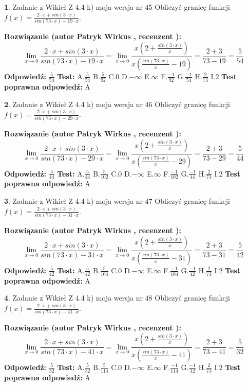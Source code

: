 \documentclass[12pt, a4paper]{article}
\theoremstyle{definition} %
\newtheorem{zad}{}
\newcommand{\zadStart}[1]{\begin{zad}#1\newline}
\newcommand{\zadStop}{\end{zad}}
\newcommand{\rozwStart}[2]{\noindent \textbf{Rozwiązanie (autor #1 , recenzent #2): }\newline}
\newcommand{\rozwStop}{\newline}
\newcommand{\odpStart}{\noindent \textbf{Odpowiedź:}\newline}
\newcommand{\odpStop}{\newline}
\newcommand{\testStart}{\noindent \textbf{Test:}\newline}
\newcommand{\testStop}{\newline}
\newcommand{\kluczStart}{\noindent \textbf{Test poprawna odpowiedź:}\newline}
\newcommand{\kluczStop}{\newline}
\begin{document}
\zadStart{Zadanie z Wikieł Z 4.4 k) moja wersja nr 45}
Obliczyć granicę funkcji $f(x)=\frac{2\cdot x +sin(3\cdot x)}{sin(73\cdot x) -19\cdot x}$.
\zadStop
\rozwStart{Patryk Wirkus}{}
$$\lim\limits_{x\to 0}\frac{2\cdot x +sin(3\cdot x)}{sin(73\cdot x) -19\cdot x}
=\lim\limits_{x\to 0}\frac{x(2+\frac{sin(3\cdot x)}{x})}{x(\frac{sin(73\cdot x)}{x}-19)}
=\frac{2+3}{73-19} = \frac{5}{54}$$
\rozwStop
\odpStart
$\frac{5}{54}$
\odpStop
\testStart
A.$\frac{5}{54}$
B.$\frac{5}{92}$
C.$0$
D.$-\infty$
E.$\infty$
F.$\frac{-1}{92}$
G.$\frac{-1}{54}$
H.$\frac{2}{73}$
I.$2$
\testStop
\kluczStart
A
\kluczStop



\zadStart{Zadanie z Wikieł Z 4.4 k) moja wersja nr 46}
Obliczyć granicę funkcji $f(x)=\frac{2\cdot x +sin(3\cdot x)}{sin(73\cdot x) -29\cdot x}$.
\zadStop
\rozwStart{Patryk Wirkus}{}
$$\lim\limits_{x\to 0}\frac{2\cdot x +sin(3\cdot x)}{sin(73\cdot x) -29\cdot x}
=\lim\limits_{x\to 0}\frac{x(2+\frac{sin(3\cdot x)}{x})}{x(\frac{sin(73\cdot x)}{x}-29)}
=\frac{2+3}{73-29} = \frac{5}{44}$$
\rozwStop
\odpStart
$\frac{5}{44}$
\odpStop
\testStart
A.$\frac{5}{44}$
B.$\frac{5}{102}$
C.$0$
D.$-\infty$
E.$\infty$
F.$\frac{-1}{102}$
G.$\frac{-1}{44}$
H.$\frac{2}{73}$
I.$2$
\testStop
\kluczStart
A
\kluczStop



\zadStart{Zadanie z Wikieł Z 4.4 k) moja wersja nr 47}
Obliczyć granicę funkcji $f(x)=\frac{2\cdot x +sin(3\cdot x)}{sin(73\cdot x) -31\cdot x}$.
\zadStop
\rozwStart{Patryk Wirkus}{}
$$\lim\limits_{x\to 0}\frac{2\cdot x +sin(3\cdot x)}{sin(73\cdot x) -31\cdot x}
=\lim\limits_{x\to 0}\frac{x(2+\frac{sin(3\cdot x)}{x})}{x(\frac{sin(73\cdot x)}{x}-31)}
=\frac{2+3}{73-31} = \frac{5}{42}$$
\rozwStop
\odpStart
$\frac{5}{42}$
\odpStop
\testStart
A.$\frac{5}{42}$
B.$\frac{5}{104}$
C.$0$
D.$-\infty$
E.$\infty$
F.$\frac{-1}{104}$
G.$\frac{-1}{42}$
H.$\frac{2}{73}$
I.$2$
\testStop
\kluczStart
A
\kluczStop



\zadStart{Zadanie z Wikieł Z 4.4 k) moja wersja nr 48}
Obliczyć granicę funkcji $f(x)=\frac{2\cdot x +sin(3\cdot x)}{sin(73\cdot x) -41\cdot x}$.
\zadStop
\rozwStart{Patryk Wirkus}{}
$$\lim\limits_{x\to 0}\frac{2\cdot x +sin(3\cdot x)}{sin(73\cdot x) -41\cdot x}
=\lim\limits_{x\to 0}\frac{x(2+\frac{sin(3\cdot x)}{x})}{x(\frac{sin(73\cdot x)}{x}-41)}
=\frac{2+3}{73-41} = \frac{5}{32}$$
\rozwStop
\odpStart
$\frac{5}{32}$
\odpStop
\testStart
A.$\frac{5}{32}$
B.$\frac{5}{114}$
C.$0$
D.$-\infty$
E.$\infty$
F.$\frac{-1}{114}$
G.$\frac{-1}{32}$
H.$\frac{2}{73}$
I.$2$
\testStop
\kluczStart
A
\kluczStop
\end{document}
